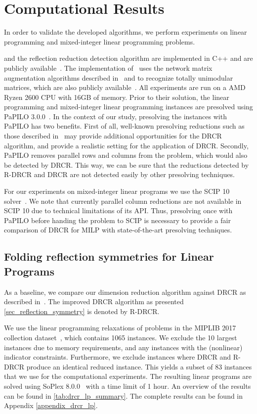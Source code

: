\documentclass[pdflatex,sn-mathphys-num]{sn-jnl}%
\theoremstyle{thmstyleone}%
\theoremstyle{thmstylethree}%
\theoremstyle{thmstyletwo}%
\begin{document}
\section{Computational Results}
 
\label{sec_results}

In order to validate the developed algorithms, we perform experiments on linear programming and mixed-integer linear programming problems.

 and the reflection reduction detection algorithm are implemented in C++ and are publicly available~\cite{VanDerHulstFolding}. The implementation of~ uses the network matrix augmentation algorithms described in~\cite{RowNetworkMatrixPaper} and \cite{BixbyWagner1988} to recognize totally unimodular matrices, which are also publicly available~\cite{VanDerHulstMatrec}.
 All experiments are run on a AMD Ryzen 2600 CPU with 16GB of memory. Prior to their solution, the linear programming and mixed-integer linear programming instances are presolved using PaPILO 3.0.0~\cite{GGHpapilo}. In the context of our study, presolving the instances with PaPILO has two benefits. First of all, well-known presolving reductions such as those described in~\cite{AchterbergBGRW20} may provide additional opportunities for the DRCR algorithm, and provide a realistic setting for the application of DRCR. Secondly, PaPILO removes parallel rows and columns from the problem, which would also be detected by DRCR. This way, we can be sure that the reductions detected by R-DRCR and DRCR are not detected easily by other presolving techniques.
 
 For our experiments on mixed-integer linear programs we use the SCIP 10 solver~\cite{hojny2025scipoptimizationsuite100}. We note that currently parallel column reductions are not available in SCIP 10 due to technical limitations of its API. Thus, presolving once with PaPILO before handing the problem to SCIP is necessary to provide a fair comparison of DRCR for MILP with state-of-the-art presolving techniques.
\subsection{Folding reflection symmetries for Linear Programs}
\label{sec_lp_folding_results}
As a baseline, we compare our dimension reduction algorithm against DRCR as described in~\cite{Grohe2014}. The improved DRCR algorithm as presented \cref{sec_reflection_symmetry} is denoted by R-DRCR.

We use the linear programming relaxations of problems in the MIPLIB 2017 collection dataset~\cite{Gleixner2021}, which contains 1065 instances. We exclude the 10 largest instances due to memory requirements, and any instances with the (nonlinear) indicator constraints. Furthermore, we exclude instances where DRCR and R-DRCR produce an identical reduced instance. This yields a subset of 83 instances that we use for the computational experiments. The resulting linear programs are solved using SoPlex 8.0.0~\cite{hojny2025scipoptimizationsuite100} with a time limit of 1 hour.
An overview of the results can be found in \cref{tab:drcr_lp_summary}. The complete results can be found in Appendix \ref{appendix_drcr_lp}.
\end{document}
